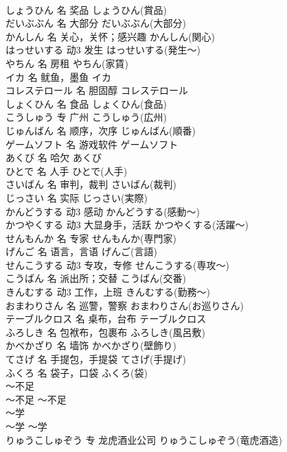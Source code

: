 \documentclass[8pt]{extreport}
\begin{document}
\begin{CJK}{UTF8}{min}
\\	しょうひん	名	奖品	しょうひん(賞品)	
\\	だいぶぶん	名	大部分	だいぶぶん(大部分)	
\\	かんしん	名	关心，关怀；感兴趣	かんしん(関心)	
\\	はっせいする	动3	发生	はっせいする(発生～)	
\\	やちん	名	房租	やちん(家賃)	
\\	イカ	名	鱿鱼，墨鱼	イカ	
\\	コレステロール	名	胆固醇	コレステロール	
\\	しょくひん	名	食品	しょくひん(食品)	
\\	こうしゅう	专	广州	こうしゅう(広州)	
\\	じゅんばん	名	顺序，次序	じゅんばん(順番)	
\\	ゲームソフト	名	游戏软件	ゲームソフト	
\\	あくび	名	哈欠	あくび	
\\	ひとで	名	人手	ひとで(人手)	
\\	さいばん	名	审判，裁判	さいばん(裁判)	
\\	じっさい	名	实际	じっさい(実際)	
\\	かんどうする	动3	感动	かんどうする(感動～)	
\\	かつやくする	动3	大显身手，活跃	かつやくする(活躍～)	
\\	せんもんか	名	专家	せんもんか(専門家)	
\\	げんご	名	语言，言语	げんご(言語)	
\\	せんこうする	动3	专攻，专修	せんこうする(専攻～)	
\\	こうばん	名	派出所；交替	こうばん(交番)	
\\	きんむする	动3	工作，上班	きんむする(勤務～)	
\\	おまわりさん	名	巡警，警察	おまわりさん(お巡りさん)	
\\	テーブルクロス	名	桌布，台布	テーブルクロス	
\\	ふろしき	名	包袱布，包裹布	ふろしき(風呂敷)	
\\	かべかざり	名	墙饰	かべかざり(壁飾り)	
\\	てさげ	名	手提包，手提袋	てさげ(手提げ)	
\\	ふくろ	名	袋子，口袋	ふくろ(袋)	
\\	～不足	
\\	～不足	～不足	
\\	～学	
\\	～学	～学	
\\	りゅうこしゅぞう	专	龙虎酒业公司	りゅうこしゅぞう(竜虎酒造)	

\end{CJK}
\end{document}
